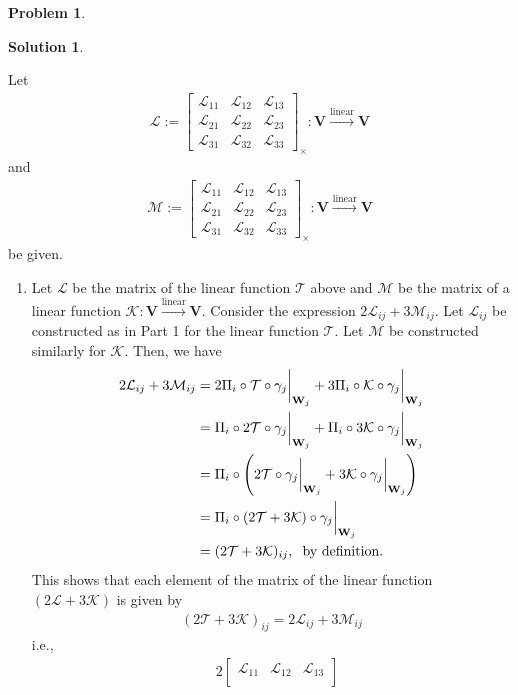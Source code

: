 \documentclass{article}
\theoremstyle{definition}
\newtheorem*{prob*}{Problem}
\newtheorem*{sln*}{Solution}
\newcommand{\V}{\mathbf{V}}
\newcommand{\W}{\mathbf{W}}
\newcommand{\lag}{\mathcal{L}}
\newcommand{\M}{\mathcal{M}}
\newcommand{\K}{\mathcal{K}}
\newcommand{\lin}{\overset{\text{linear}}{\longrightarrow}}
\newcommand{\T}{\mathcal{T}}
\begin{document}
\begin{prob*}
\begin{sln*}
\begin{enumerate}
			Let 
			\begin{align*}
			\lag := \begin{bmatrix}
			\lag_{11} & \lag_{12} & \lag_{13}\\
			\lag_{21} & \lag_{22} & \lag_{23}\\
			\lag_{31} & \lag_{32} & \lag_{33} 
			\end{bmatrix}_\times : \V \lin \V
			\end{align*}
			and
			\begin{align*}
			\M := \begin{bmatrix}
			\lag_{11} & \lag_{12} & \lag_{13}\\
			\lag_{21} & \lag_{22} & \lag_{23}\\
			\lag_{31} & \lag_{32} & \lag_{33} 
			\end{bmatrix}_\times : \V \lin \V
			\end{align*}
			be given. 
			\begin{enumerate}
			\item Let $\lag$ be the matrix of the linear function $\T$ above and $\M$ be the matrix of a linear function $\K : \V \lin \V$. Consider the expression $2\lag_{ij} + 3\M_{ij}$. Let $\lag_{ij}$ be constructed as in Part 1 for the linear function $\T$. Let $\M$ be constructed similarly for $\K$. Then, we have
			\begin{align*}
			2\lag_{ij} + 3\M_{ij} &= 2\Pi_i \circ \T \circ \gamma_j\bigg\vert_{\W_j} + 
			3\Pi_i \circ \K \circ \gamma_j\bigg\vert_{\W_j}\\
			&= \Pi_i \circ 2\T \circ \gamma_j\bigg\vert_{\W_j} + 
			\Pi_i \circ 3\K \circ \gamma_j\bigg\vert_{\W_j}\\
			&= \Pi_i \circ \left( 2\T \circ \gamma_j\bigg\vert_{\W_j} + 3\K \circ \gamma_j\bigg\vert_{\W_j}  \right)\\
			&= \Pi_i \circ \left( 2\T + 3\K \right) \circ \gamma_j\bigg\vert_{\W_j}\\
			&= (2\T + 3\K)_{ij},\hspace{0.2cm}\text{by definition.}
			\end{align*}
			This shows that each element of the matrix of the linear function $(2\lag + 3\K)$ is given by
			\begin{align*}
			\boxed{(2\T + 3\K)_{ij} = 2\lag_{ij} + 3\M_{ij}}
			\end{align*}
			i.e.,
			\begin{align*}
			&2\begin{bmatrix}
			\lag_{11} & \lag_{12} & \lag_{13}\\

\end{bmatrix}
\end{align*}
\end{enumerate}
\end{enumerate}
\end{sln*}
\end{prob*}
\end{document}
